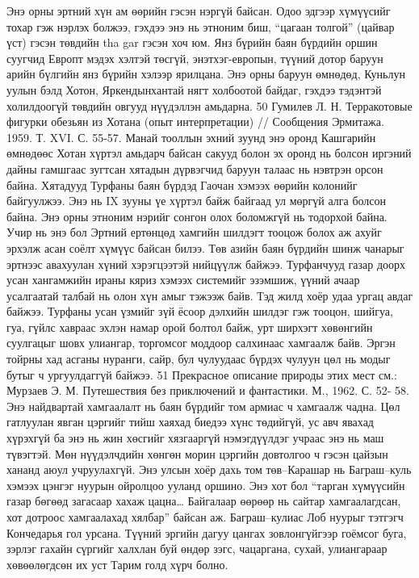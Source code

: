 Энэ орны эртний хүн ам өөрийн гэсэн нэргүй байсан. Одоо эдгээр хүмүүсийг тохар гэж нэрлэх болжээ, гэхдээ энэ нь этноним биш, “цагаан толгой” (цайвар үст) гэсэн төвдийн tha gar гэсэн хоч юм. Янз бүрийн баян бүрдийн оршин суугчид Европт мэдэх хэлтэй төсгүй, энэтхэг-европын, түүний дотор баруун арийн бүлгийн янз бүрийн хэлээр ярилцана. Энэ орны баруун өмнөдөд, Куньлун уулын бэлд Хотон, Яркендынхантай нягт холбоотой байдаг, гэхдээ тэдэнтэй холилдоогүй төвдийн овгууд нүүдэллэн амьдарна.
50 Гумилев Л. Н. Терракотовые фигурки обезьян из Хотана (опыт интерпретации) // Сообщения Эрмитажа. 1959. Т. XVI. С. 55-57.
Манай тооллын эхний зуунд энэ оронд Кашгарийн өмнөдөөс Хотан хүртэл амьдарч байсан сакууд болон эх оронд нь болсон иргэний дайны гамшгаас зугтсан хятадын дүрвэгчид баруун талаас нь нэвтрэн орсон байна. Хятадууд Турфаны баян бүрдэд Гаочан хэмээх өөрийн колонийг байгуулжээ. Энэ нь IX зууны үе хүртэл байж байгаад ул мөргүй алга болсон байна. Энэ орны этноним нэрийг сонгон олох боломжгүй нь тодорхой байна. Учир нь энэ бол Эртний ертөнцөд хамгийн шилдэгт тооцож болох аж ахуйг эрхэлж асан соёлт хүмүүс байсан билээ.
Төв азийн баян бүрдийн шинж чанарыг эртнээс авахуулан хүний хэрэгцээтэй нийцүүлж байжээ. Турфанчууд газар доорх усан хангамжийн ираны кяриз хэмээх системийг эзэмшиж, үүний ачаар усалгаатай талбай нь олон хүн амыг тэжээж байв. Тэд жилд хоёр удаа ургац авдаг байжээ. Турфаны усан үзмийг зүй ёсоор дэлхийн шилдэг гэж тооцон, шийгуа, гуа, гүйлс хавраас эхлэн намар орой болтол байж, урт ширхэгт хөвөнгийн суулгацыг шовх улиангар, торгомсог моддоор салхинаас хамгаалж байв. Эргэн тойрны хад асганы нуранги, сайр, бул чулуудаас бүрдэх чулуун цөл нь модыг бутыг ч ургуулдаггүй байжээ.
51 Прекрасное описание природы этих мест см.: Мурзаев Э. М. Путешествия без приключений и фантастики. М., 1962. С. 52- 58.
Энэ найдвартай хамгаалалт нь баян бүрдийг том армиас ч хамгаалж чадна. Цөл гатлуулан явган цэргийг тийш хаяхад биедээ хүнс төдийгүй, ус авч явахад хүрэхгүй ба энэ нь жин хөсгийг хязгааргүй нэмэгдүүлдэг учраас энэ нь маш түвэгтэй. Мөн нүүдэлчдийн хөнгөн морин цэргийн довтолгоо ч гэсэн цайзын хананд аюул учруулахгүй. Энэ улсын хоёр дахь том төв–Карашар нь Баграш–куль хэмээх цэнгэг нуурын ойролцоо ууланд оршино. Энэ хот бол “тарган хүмүүсийн газар бөгөөд загасаар хахаж цацна… Байгалаар өөрөөр нь сайтар хамгаалагдсан, хот дотроос хамгаалахад хялбар” байсан аж. Баграш–кулиас Лоб нуурыг тэтгэгч Кончедарья гол урсана. Түүний эргийн дагуу цангах зовлонгүйгээр гоёмсог буга, зэрлэг гахайн сүргийг халхлан буй өндөр зэгс, чацаргана, сухай, улиангараар хөвөөлөгдсөн их уст Тарим голд хүрч болно.
